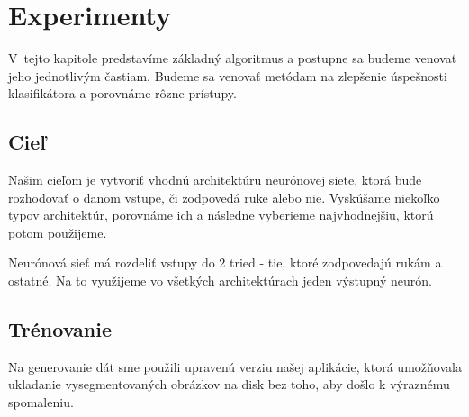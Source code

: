 \chapter{Experimenty}\label{chap:experiments}

V~tejto kapitole predstavíme základný algoritmus a postupne sa budeme venovať jeho jednotlivým častiam. Budeme sa venovať metódam na zlepšenie úspešnosti klasifikátora a porovnáme rôzne prístupy. 
\bigskip


\section{Cieľ}

Našim cieľom je vytvoriť vhodnú architektúru neurónovej siete, ktorá bude rozhodovať o danom vstupe, či zodpovedá ruke alebo nie. Vyskúšame niekoľko typov architektúr, porovnáme ich a následne vyberieme najvhodnejšiu, ktorú potom použijeme. 

Neurónová sieť má rozdeliť vstupy do 2 tried - tie, ktoré zodpovedajú rukám a ostatné. Na to využijeme vo všetkých architektúrach jeden výstupný neurón.



\section{Trénovanie}

Na generovanie dát sme použili upravenú verziu našej aplikácie, ktorá umožňovala ukladanie vysegmentovaných obrázkov na disk bez toho, aby došlo k výraznému spomaleniu. 



